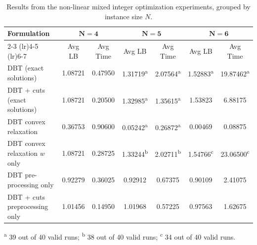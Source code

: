 \documentclass[11pt,reqno,a4paper]{amsart}
\numberwithin{equation}{section}
\theoremstyle{mytheorem}
\theoremstyle{myremark}
\theoremstyle{myparagraph}
\begin{document}
    \begin{table}[ht]
        \centering
        \scriptsize
        \renewcommand{\arraystretch}{1.2}
        \setlength{\tabcolsep}{6pt}
        \begin{threeparttable}
            \begin{tabular}{l cc|cc|cc}
                \toprule
                \textbf{Formulation} & \multicolumn{2}{c|}{\(\mathbf{N=4}\)} & \multicolumn{2}{c|}{\(\mathbf{N=5}\)} & \multicolumn{2}{c}{\(\mathbf{N=6}\)} \\
                \cmidrule(lr){2-3} \cmidrule(lr){4-5} \cmidrule(lr){6-7}
                & Avg LB  & Avg Time & Avg LB                     & Avg Time                   & Avg LB                     & Avg Time                    \\
                \midrule
                DBT (exact solutions)            & 1.08721 & 0.47950  & 1.31719\textsuperscript{a} & 2.07564\textsuperscript{a} & 1.52883\textsuperscript{a} & 19.87462\textsuperscript{a} \\
                DBT + cuts (exact solutions)     & 1.08721 & 0.20500  & 1.32985\textsuperscript{a} & 1.35615\textsuperscript{a} & 1.53823                    & 6.88175                     \\
                DBT convex relaxation            & 0.36753 & 0.90600  & 0.05242\textsuperscript{a} & 0.26872\textsuperscript{a} & 0.00469           & 0.08875           \\
                DBT convex relaxation \(w\) only & 1.08721 & 0.28725  & 1.33244\textsuperscript{b} & 2.02711\textsuperscript{b} & 1.54766\textsuperscript{c} & 23.06500\textsuperscript{c} \\
                DBT pre-processing only          & 0.92279 & 0.36025  & 0.92912                    & 0.67375                    & 0.90109                    & 2.41075                     \\
                DBT + cuts preprocessing only    & 1.01456 & 0.14950  & 1.01968                    & 0.57225                    & 0.97563                    & 1.62675                     \\
                \bottomrule
            \end{tabular}
            \begin{tablenotes}
                \footnotesize
                \item[] \textsuperscript{a} 39 out of 40 valid runs; \textsuperscript{b} 38 out of 40 valid runs; \textsuperscript{c} 34 out of 40 valid runs.
            \end{tablenotes}
        \end{threeparttable}
        \caption{Results from the non-linear mixed integer optimization experiments, grouped by instance size \(N\).}
        \label{tab:experiment_results_grouped_2}
    \end{table}
\end{document}

